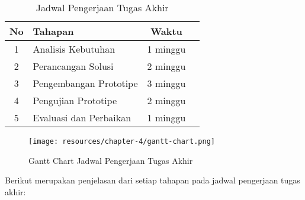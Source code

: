 \begin{table}[h]
	\caption{Jadwal Pengerjaan Tugas Akhir}
	\vspace{0.25cm}
	\begin{center}
		\begin{tabular}{|c|l|c|l|}
			\hline
			\textbf{No} & \textbf{Tahapan}       & \textbf{Waktu} \\ \hline
			1           & Analisis Kebutuhan     & 1 minggu       \\ \hline
			2           & Perancangan Solusi     & 2 minggu       \\ \hline
			3           & Pengembangan Prototipe & 3 minggu       \\ \hline
			4           & Pengujian Prototipe    & 2 minggu       \\ \hline
			5           & Evaluasi dan Perbaikan & 1 minggu       \\ \hline
		\end{tabular}
	\end{center}
\end{table}

\begin{figure}[ht]
	\centering
	\texttt{[image: resources/chapter-4/gantt-chart.png]}
	\caption{Gantt Chart Jadwal Pengerjaan Tugas Akhir}
	\label{image:gantt-chart}
\end{figure}

Berikut merupakan penjelasan dari setiap tahapan pada jadwal pengerjaan tugas akhir:

